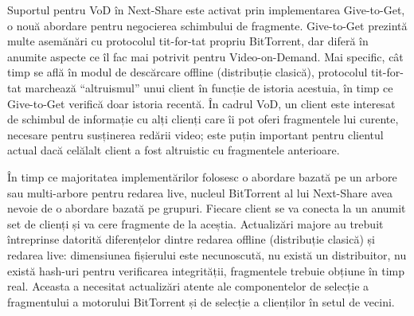 Suportul pentru VoD în Next-Share este activat prin implementarea Give-to-Get,
o nouă abordare pentru negocierea schimbului de fragmente. Give-to-Get prezintă
multe asemănări cu protocolul tit-for-tat propriu BitTorrent, dar diferă în anumite
aspecte ce îl fac mai potrivit pentru Video-on-Demand. Mai specific, cât timp se
află în modul de descărcare offline (distribuție clasică), protocolul tit-for-tat
marchează ``altruismul'' unui client în funcție de istoria acestuia, în timp ce
Give-to-Get verifică doar istoria recentă. În cadrul VoD, un client este interesat
de schimbul de informație cu alți clienți care îi pot oferi fragmentele lui
curente, necesare pentru susținerea redării video; este puțin important pentru
clientul actual dacă celălalt client a fost altruistic cu fragmentele anterioare.

În timp ce majoritatea implementărilor folosesc o abordare bazată pe un arbore
sau multi-arbore pentru redarea live, nucleul BitTorrent al lui Next-Share
avea nevoie de o abordare bazată pe grupuri. Fiecare client se va conecta la
un anumit set de clienți și va cere fragmente de la aceștia. Actualizări
majore au trebuit întreprinse datorită diferențelor dintre redarea offline
(distribuție clasică) și redarea live: dimensiunea fișierului este necunoscută,
nu există un distribuitor, nu există hash-uri pentru verificarea integrității,
fragmentele trebuie obțiune în timp real. Aceasta a necesitat actualizări
atente ale componentelor de selecție a fragmentului a motorului BitTorrent și
de selecție a clienților în setul de vecini.

